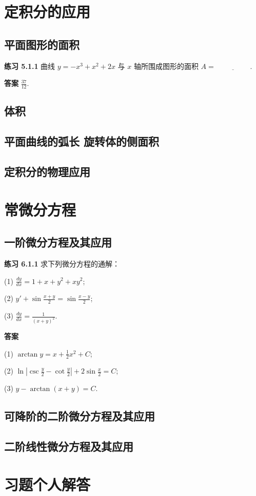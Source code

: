 \documentclass[lang=cn,10pt]{elegantbook}
\begin{document}
\chapter{定积分的应用}
\section{平面图形的面积}
 \textbf{练习 5.1.1} 曲线 $y = -x^3 + x^2 + 2x$ 与 $x$ 轴所围成图形的面积 $A = \underline{\hspace{2cm}}$.

\textbf{答案} $\frac{37}{12}$.
\section{体积}
\section{平面曲线的弧长 旋转体的侧面积}
\section{定积分的物理应用}





\chapter{常微分方程}
\section{一阶微分方程及其应用}
\textbf{练习 6.1.1} 求下列微分方程的通解：

(1) $\frac{dy}{dx} = 1 + x + y^2 + xy^2$;

(2) $y' + \sin\frac{x+y}{2} = \sin\frac{x-y}{2}$;

(3) $\frac{dy}{dx} = \frac{1}{(x+y)^2}$.

\textbf{答案}

(1) $\arctan y = x + \frac{1}{2}x^2 + C$;

(2) $\ln \left| \csc \frac{y}{2} - \cot \frac{y}{2} \right| + 2\sin \frac{x}{2} = C$;

(3) $y - \arctan(x+y) = C$.

\section{可降阶的二阶微分方程及其应用}
\section{二阶线性微分方程及其应用}





















\chapter*{习题个人解答}
\nocite{*}
\end{document}

